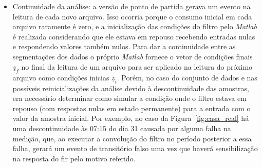 \begin{itemize}
\item Continuidade da análise: a versão de ponto de partida gerava
um evento na leitura de cada novo arquivo. Isso ocorria porque o
consumo inicial em cada arquivo raramente é zero, e a inicialização
das condições do filtro pelo \emph{Matlab} é realizada considerando
que ele estava em repouso recebendo entradas nulas e respondendo
valores também nulos. Para dar a continuidade entre as segmentações
dos dados o próprio \emph{Matlab} fornece o vetor de condições finais
$\underline{z}_f$ no final da leitura de um arquivo para ser aplicado
na leitura do próximo arquivo como condições inicias
$\underline{z}_i$. Porém, no caso do conjunto de dados e nas possíveis
reinicializações da análise devido à descontinuidade das amostras, era
necessário determinar como simular a condição onde o filtro estava em
repouso (com respostas nulas em estado permanente) para a entrada com
o valor da amostra inicial. Por exemplo, no caso da
Figura~\ref{fig:casa_real} há uma descontinuidade às 07:15 do dia 31
causada por alguma falha na medição, que, ao executar a convolução do
filtro no período posterior a essa falha, gerará um evento de
transitório falso uma vez que haverá sensibilização na resposta do
\acs{fir} pelo motivo referido.


\end{itemize}
